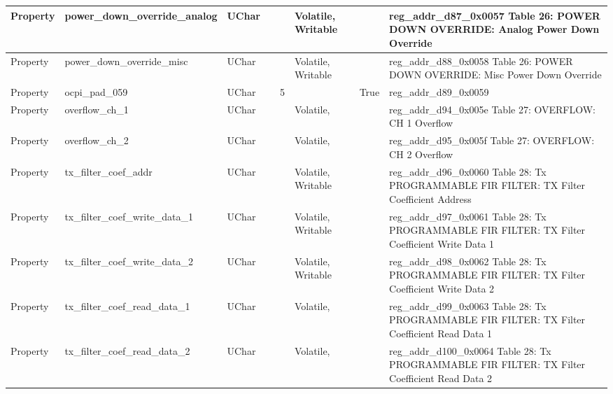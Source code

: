 \documentclass{article}
\begin{document}
\begin{scriptsize}
\begin{longtable}{|p{2cm}|p{5cm}|p{1cm}|p{2cm}|p{2cm}|p{1.75cm}|p{1.5cm}|p{5.1cm}|}
  \hline
  Property & power\_down\_override\_analog                            & UChar &                  &                  & Volatile,  Writable &         & reg\_addr\_d87\_0x0057  Table 26: POWER DOWN OVERRIDE: Analog Power Down Override \\
  \hline
  Property & power\_down\_override\_misc                              & UChar &                  &                  & Volatile,  Writable &         & reg\_addr\_d88\_0x0058  Table 26: POWER DOWN OVERRIDE: Misc Power Down Override \\
  \hline
  Property & ocpi\_pad\_059                                           & UChar &                  & 5                &                     & True    & reg\_addr\_d89\_0x0059 \\
  \hline
  Property & overflow\_ch\_1                                          & UChar &                  &                  & Volatile,           &         & reg\_addr\_d94\_0x005e  Table 27: OVERFLOW: CH 1 Overflow \\
  \hline
  Property & overflow\_ch\_2                                          & UChar &                  &                  & Volatile,           &         & reg\_addr\_d95\_0x005f  Table 27: OVERFLOW: CH 2 Overflow \\
  \hline
  Property & tx\_filter\_coef\_addr                                   & UChar &                  &                  & Volatile,  Writable &         & reg\_addr\_d96\_0x0060  Table 28: Tx PROGRAMMABLE FIR FILTER: TX Filter Coefficient Address \\
  \hline
  Property & tx\_filter\_coef\_write\_data\_1                         & UChar &                  &                  & Volatile,  Writable &         & reg\_addr\_d97\_0x0061  Table 28: Tx PROGRAMMABLE FIR FILTER: TX Filter Coefficient Write Data 1 \\
  \hline
  Property & tx\_filter\_coef\_write\_data\_2                         & UChar &                  &                  & Volatile,  Writable &         & reg\_addr\_d98\_0x0062  Table 28: Tx PROGRAMMABLE FIR FILTER: TX Filter Coefficient Write Data 2 \\
  \hline
  Property & tx\_filter\_coef\_read\_data\_1                          & UChar &                  &                  & Volatile,           &         & reg\_addr\_d99\_0x0063  Table 28: Tx PROGRAMMABLE FIR FILTER: TX Filter Coefficient Read Data 1 \\
  \hline
  Property & tx\_filter\_coef\_read\_data\_2                          & UChar &                  &                  & Volatile,           &         & reg\_addr\_d100\_0x0064 Table 28: Tx PROGRAMMABLE FIR FILTER: TX Filter Coefficient Read Data 2 \\

\end{longtable}
\end{scriptsize}
\end{document}
